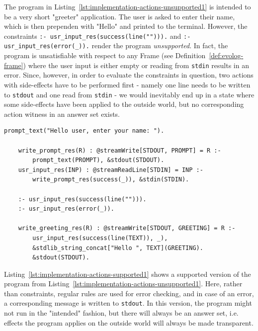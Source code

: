 \begin{example}
\label{ex:implementation-actions-unsupported}    
The program in Listing~\ref{lst:implementation-actions-unsupported1} is intended to be a very short "greeter" application. The user is asked to enter their name, which is then prependen with "Hello" and printed to the terminal. However, the constraints \texttt{:- usr\_input\_res(success(line(""))).} and \texttt{:- usr\_input\_res(error(\_)).} render the program \emph{unsupported}. In fact, the program is unsatisfiable with respect to any Frame (see Definition~\ref{def:evolog-frame}) where the user input is either empty or reading from \texttt{stdin} results in an error. Since, however, in order to evaluate the constraints in question, two actions with side-effects have to be performed first - namely one line needs to be written to \texttt{stdout} and one read from \texttt{stdin} - we would inevitably end up in a state where some side-effects have been applied to the outside world, but no corresponding action witness in an answer set exists.

\begin{lstlisting}[style=asp-code, label={lst:implementation-actions-unsupported1}, caption={An unsupported "greeter" application.}]
    prompt_text("Hello user, enter your name: ").
        
    write_prompt_res(R) : @streamWrite[STDOUT, PROMPT] = R :- 
        prompt_text(PROMPT), &stdout(STDOUT).
    usr_input_res(INP) : @streamReadLine[STDIN] = INP :- 
        write_prompt_res(success(_)), &stdin(STDIN).

    :- usr_input_res(success(line(""))).
    :- usr_input_res(error(_)).  

    write_greeting_res(R) : @streamWrite[STDOUT, GREETING] = R :- 
        usr_input_res(success(line(TEXT)), _),
        &stdlib_string_concat["Hello ", TEXT](GREETING).
        &stdout(STDOUT).   
\end{lstlisting}       

Listing~\ref{lst:implementation-actions-supported1} shows a supported version of the program from Listing~\ref{lst:implementation-actions-unsupported1}. Here, rather than constraints, regular rules are used for error checking, and in case of an error, a corresponding message is written to \texttt{stdout}. In this version, the program might not run in the "intended" fashion, but there will always be an answer set, i.e. effects the program applies on the outside world will always be made transparent.


\end{example}
